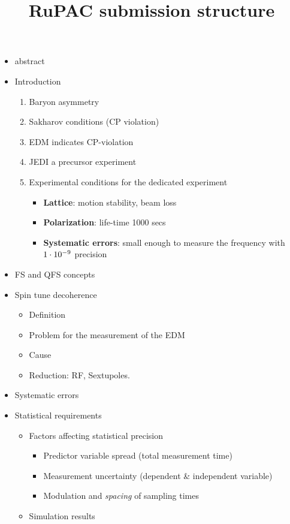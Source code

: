 \documentclass{article}
\begin{document}
\title{RuPAC submission structure}
\date{}
\maketitle
	\begin{itemize}
		\item abstract
		\item Introduction
		\begin{enumerate}
			\item Baryon asymmetry
			\item Sakharov conditions (CP violation)
			\item EDM indicates CP-violation
			\item JEDI a precursor experiment
			\item Experimental conditions for the dedicated experiment
				\begin{itemize}
					\item \textbf{Lattice}: motion stability, beam loss
					\item \textbf{Polarization}: life-time 1000 secs
					\item \textbf{Systematic errors}: small enough to measure the frequency with ${1}\cdot 10^{-9}$ precision				
				\end{itemize}
		\end{enumerate}
		\item FS and QFS concepts
		\item Spin tune decoherence
			\begin{itemize}
				\item Definition
				\item Problem for the measurement of the EDM
				\item Cause
				\item Reduction: RF, Sextupoles.
			\end{itemize}
		\item Systematic errors
		\item Statistical requirements
			\begin{itemize}
				\item Factors affecting statistical precision
					\begin{itemize}
						\item Predictor variable spread (total measurement time)
						\item Measurement uncertainty (dependent \& independent variable)
						\item Modulation and \emph{spacing} of sampling times
					\end{itemize}
				\item Simulation results
			\end{itemize}
	\end{itemize}
\end{document}
